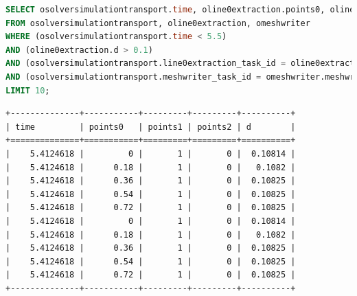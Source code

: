 \begin{minipage}[c]{0.95\textwidth}
\begin{lstlisting}[language=sql,deletendkeywords={TIME},label={lst:experiments-2-sql},caption={[Código em SQL gerado na consulta~\#2]Código em SQL gerado na consulta~\#2. Tempo médio de geração: 15,45~ms.}]
SELECT osolversimulationtransport.time, oline0extraction.points0, oline0extraction.points1, oline0extraction.points2, oline0extraction.d
FROM osolversimulationtransport, oline0extraction, omeshwriter
WHERE (osolversimulationtransport.time < 5.5) 
AND (oline0extraction.d > 0.1) 
AND (osolversimulationtransport.line0extraction_task_id = oline0extraction.line0extraction_task_id) 
AND (osolversimulationtransport.meshwriter_task_id = omeshwriter.meshwriter_task_id)
LIMIT 10;
\end{lstlisting}
\end{minipage}

\begin{lstlisting}[language=sqlresults,label={lst:experiments-2-sqlresults},caption={[Resultados da consulta \#2.]Resultados da consulta \#2. Tempo médio de execução: 5,92~ms).}]
+--------------+-----------+---------+---------+----------+
| time         | points0   | points1 | points2 | d        |
+==============+===========+=========+=========+==========+
|    5.4124618 |         0 |       1 |       0 |  0.10814 |
|    5.4124618 |      0.18 |       1 |       0 |   0.1082 |
|    5.4124618 |      0.36 |       1 |       0 |  0.10825 |
|    5.4124618 |      0.54 |       1 |       0 |  0.10825 |
|    5.4124618 |      0.72 |       1 |       0 |  0.10825 |
|    5.4124618 |         0 |       1 |       0 |  0.10814 |
|    5.4124618 |      0.18 |       1 |       0 |   0.1082 |
|    5.4124618 |      0.36 |       1 |       0 |  0.10825 |
|    5.4124618 |      0.54 |       1 |       0 |  0.10825 |
|    5.4124618 |      0.72 |       1 |       0 |  0.10825 |
+--------------+-----------+---------+---------+----------+
\end{lstlisting}

